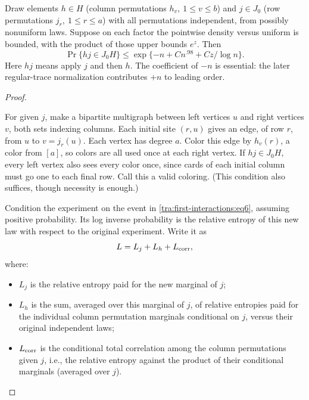 \begin{proposition}\label{tra:first-interactions:grid}

\label{tra:first-interactions:grid-statement}
Draw elements \(h\in H\) (column permutations \(h_v,\ 1\le v\le b\)) and \(j\in J_0\) (row permutations \(j_r,\ 1\le r\le a\)) with all permutations independent, from possibly nonuniform laws. Suppose on each factor the pointwise density versus uniform is bounded, with the product of those upper bounds \(e^z\). Then
\begin{equation}
              \Pr\{ h j\in J_0 H\}
                  \le \exp\{-n+C n^{.98} + C z/\log n\}.\label{tra:first-interactions:eq6}
\end{equation}
Here \(h j\) means apply \(j\) and then \(h\). The coefficient of $-n$ is essential: the later regular-trace
normalization contributes $+n$ to leading order.

\end{proposition}\begin{proof}\label{tra:first-interactions:grid-proof}

\label{tra:first-interactions:total-correlation-exposure}
For given \(j\), make a bipartite multigraph between left vertices \(u\) and right vertices \(v\), both sets indexing columns. Each initial site \((r,u)\) gives an edge, of row \(r\), from \(u\) to \(v=j_r(u)\). Each vertex has degree \(a\). Color this edge by \(h_v(r)\), a color from \([a]\), so colors are all used once at each right vertex. If \(hj\in J_0 H\), every left vertex also sees every color once, since cards of each initial column must go one to each final row. Call this a valid coloring. (This condition also suffices, though necessity is enough.)

Condition the experiment on the event in \eqref{tra:first-interactions:eq6}, assuming positive probability. Its log inverse probability is the relative entropy of this new law with respect to the original experiment. Write it as
\[
                   L=L_j+L_h+L_{\rm corr},
\]
where:
\begin{itemize}
\item \(L_j\) is the relative entropy paid for the new marginal of \(j\);
\item \(L_h\) is the sum, averaged over this marginal of \(j\), of relative entropies paid for the individual column permutation marginals conditional on \(j\), versus their original independent laws;
\item \(L_{\rm corr}\) is the conditional total correlation among the column permutations given \(j\), i.e., the relative entropy against the product of their conditional marginals (averaged over \(j\)).


\end{itemize}
\end{proof}
